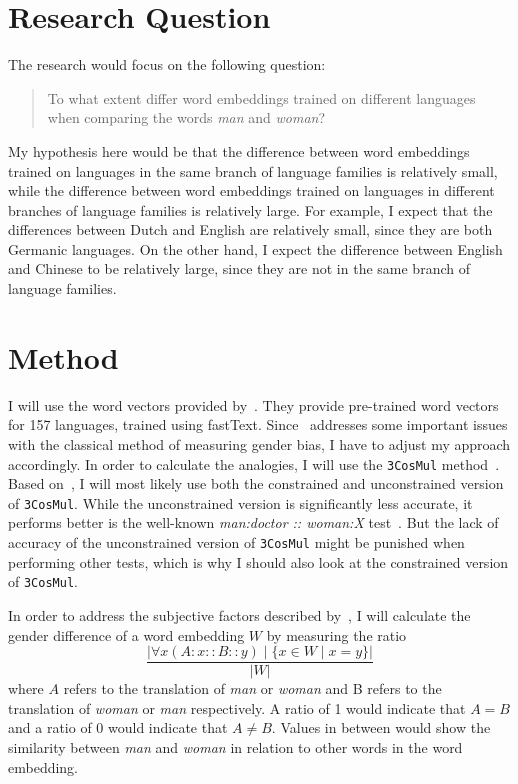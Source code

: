 \documentclass[english, a4paper, 10pt]{article}
\begin{document}
\section*{Research Question}
The research would focus on the following question:

\begin{quote}
    To what extent differ word embeddings trained on different languages when comparing
    the words \textit{man} and \textit{woman}?
\end{quote}

My hypothesis here would be that the difference between word embeddings
trained on languages in the same branch of language families is relatively small, while
the difference between word embeddings trained on languages in different branches of
language families is relatively large.
For example, I expect that the differences between Dutch and English are
relatively small, since they are both Germanic languages. On the other hand, I expect the
difference between English and Chinese to be relatively large, since they are not in the
same branch of language families.

\section*{Method}
I will use the word vectors provided by~\cite{grave2018learning}. They provide
pre-trained word vectors for 157 languages, trained using fastText.
Since~\cite{nissim_fair_is_better_2020} addresses some important issues with the classical method
of measuring gender bias, I have to adjust my approach accordingly.
In order to calculate the analogies, I will use the \texttt{3CosMul}
method~\cite{Levy14linguisticregularities}. Based on~\cite{nissim_fair_is_better_2020},
I will most likely use both the constrained and unconstrained version of \texttt{3CosMul}.
While the unconstrained version is significantly less accurate, it performs better is the
well-known \textit{man:doctor :: woman:X} test~\cite{nissim_fair_is_better_2020}.
But the lack of accuracy of the unconstrained version of \texttt{3CosMul} might be
punished when performing other tests, which is why I should also look at the constrained
version of \texttt{3CosMul}.

In order to address the subjective factors described by~\cite{nissim_fair_is_better_2020}, I
will calculate the gender difference of a word embedding $W$ by measuring the ratio
$$
\frac{ |\forall x (A : x :: B :: y) \mid \{x \in W \mid x = y\}| } { |W| }
$$
where $A$ refers to the translation of \textit{man} or \textit{woman} and B refers to the translation of \textit{woman} or \textit{man} respectively.
A ratio of 1 would indicate that $A = B$ and a ratio of 0 would indicate that $A \neq B$.
Values in between would show the similarity between \textit{man} and \textit{woman} in relation to other words in the word embedding.
\end{document}
